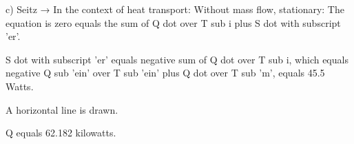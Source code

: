 c) Seitz → In the context of heat transport:
Without mass flow, stationary:
The equation is zero equals the sum of Q dot over T sub i plus S dot with subscript 'er'.

S dot with subscript 'er' equals negative sum of Q dot over T sub i, which equals negative Q sub 'ein' over T sub 'ein' plus Q dot over T sub 'm', equals 45.5 Watts.

A horizontal line is drawn.

Q equals 62.182 kilowatts.